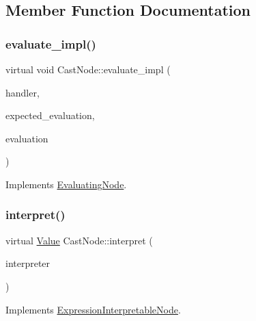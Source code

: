 \subsection{Member Function Documentation}
\mbox{\label{classCastNode_ae0c32d5d076c2572fa7afc9cb1a76a79}} 
\subsubsection{\texorpdfstring{evaluate\+\_\+impl()}{evaluate\_impl()}}
{\footnotesize\ttfamily virtual void Cast\+Node\+::evaluate\+\_\+impl (\begin{DoxyParamCaption}\item[{\hyperlink{classSystemHandler}{System\+Handler} $\ast$}]{handler,  }\item[{\hyperlink{statics_8h_a6664c451ca7787483a7981cc1de68dbb}{E\+V\+A\+L\+U\+A\+T\+I\+O\+N\+\_\+\+T\+Y\+PE}}]{expected\+\_\+evaluation,  }\item[{struct \hyperlink{structEvaluation}{Evaluation} $\ast$}]{evaluation }\end{DoxyParamCaption})\hspace{0.3cm}{\ttfamily [virtual]}}



Implements \hyperlink{classEvaluatingNode_a085fa06e0b46a93c814dc55cda0c1b26}{Evaluating\+Node}.

\mbox{\label{classCastNode_a2a909a7531791bcbc53c514a01ce5024}} 
\subsubsection{\texorpdfstring{interpret()}{interpret()}}
{\footnotesize\ttfamily virtual \hyperlink{classValue}{Value} Cast\+Node\+::interpret (\begin{DoxyParamCaption}\item[{\hyperlink{classInterpreter}{Interpreter} $\ast$}]{interpreter }\end{DoxyParamCaption})\hspace{0.3cm}{\ttfamily [virtual]}}



Implements \hyperlink{classExpressionInterpretableNode_a43650f046c48fc539f77a207e3c9181e}{Expression\+Interpretable\+Node}.

